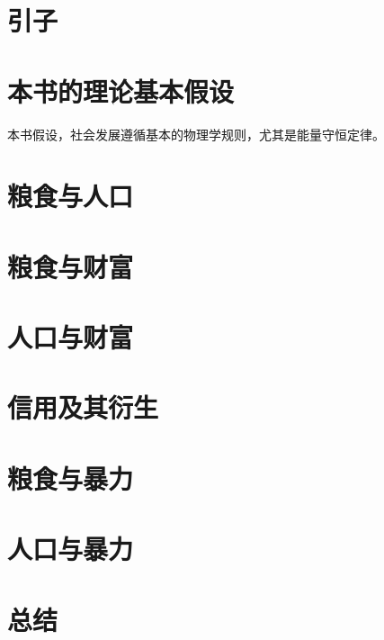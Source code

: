 \section{引子}
\section{本书的理论基本假设}
本书假设，社会发展遵循基本的物理学规则，尤其是能量守恒定律。
\section{粮食与人口}
\section{粮食与财富}
\section{人口与财富}
\section{信用及其衍生}
\section{粮食与暴力}
\section{人口与暴力}
\section{总结}

